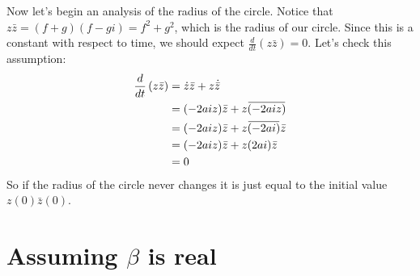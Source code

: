 \documentclass[10pt]{article}
\newcommand{\overbar}[1]{\mkern 1.5mu\overline{\mkern-1.5mu#1\mkern-1.5mu}\mkern 1.5mu}
\begin{document}
Now let's begin an analysis of the radius of the circle.
Notice that $z\bar z=(f+g)(f-gi)=f^2+g^2$, which is the radius of our circle. 
Since this is a constant with respect to time, we should expect $\frac{d}{dt}\left(z\bar z\right)=0$.
Let's check this assumption:
\begin{align*}
\frac{d}{dt}\left(z\bar z\right)&=\dot z\bar z+z\dot {\bar z}\\
&=(-2aiz)\bar z+z\overbar{(-2aiz)}\\
&=(-2aiz)\bar z+z\overbar{(-2ai)}\bar z\\
&=(-2aiz)\bar z+z(2ai)\bar z\\
&=0
\end{align*}
So if the radius of the circle never changes it is just equal to the initial value $z(0)\bar z(0)$.

\section{Assuming $\beta$ is real}
\end{document}
